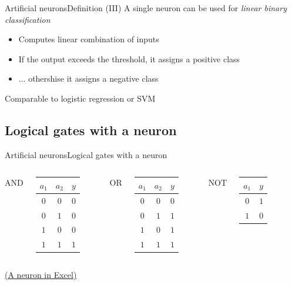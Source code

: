 \documentclass[10pt,compress]{beamer} %
\begin{document}
\begin{frame}{Artificial neurons}{Definition (III)}
	A single neuron can be used for \textit{linear binary classification}
	\begin{itemize}
	\item Computes linear combination of inputs
	\item If the output exceeds the threshold, it assigns a positive class
	\item ... othershise it assigns a negative class
	\end{itemize}

	Comparable to logistic regression or SVM
\end{frame}


\subsection{Logical gates with a neuron}
\begin{frame}{Artificial neurons}{Logical gates with a neuron}
    \begin{columns}
	   		\centering AND\\
            

			 \begin{tabular}{ccc}\hline
			 $a_1$ & $a_2$ & $y$ \\\hline
			 $0$ & $0$ & $0$ \\
			 $0$ & $1$ & $0$ \\
			 $1$ & $0$ & $0$ \\
			 $1$ & $1$ & $1$ \\
			 \end{tabular}
	   		\centering OR\\
            

			 \begin{tabular}{ccc}\hline
			 $a_1$ & $a_2$ & $y$ \\\hline
			 $0$ & $0$ & $0$ \\
			 $0$ & $1$ & $1$ \\
			 $1$ & $0$ & $1$ \\
			 $1$ & $1$ & $1$ \\
			 \end{tabular}
	   		\centering NOT\\\bigskip
            
			\vspace{1cm}
			 \begin{tabular}{cc}\hline
			 $a_1$ & $y$ \\\hline
			 $0$ & $1$ \\
			 $1$ & $0$ \\
			 \end{tabular}
    \end{columns}
	\bigskip
	\centering \href{https://github.com/dfbarrero/dataCourse/raw/master/ann/artificialNeuron.xlsx}{(A neuron in Excel)}
\end{frame}
\end{document}
